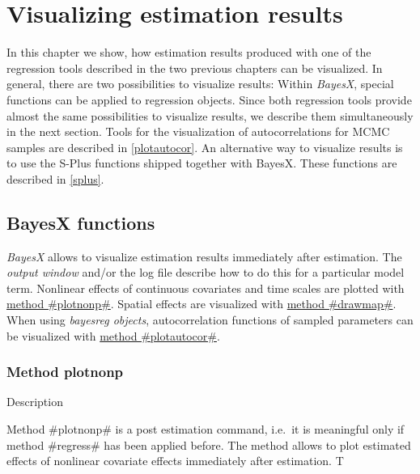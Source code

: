 \chapter{Visualizing estimation results}
\label{visualization} 

In this chapter we show, how estimation results produced with one of
the regression tools described in the two previous chapters can be
visualized. In general, there are two possibilities to visualize
results: Within {\em BayesX}, special functions can be applied to
regression objects. Since both regression tools provide almost the
same possibilities to visualize results, we describe them
simultaneously in the next section. Tools for the visualization of
autocorrelations for MCMC samples are described in
\autoref{plotautocor}. An alternative way to visualize results is to
use the S-Plus functions shipped together with BayesX. These
functions are described in \autoref{splus}.

\section{BayesX functions} \label{bayesxplot}

{\em BayesX} allows to visualize estimation results immediately
after estimation. The {\em output window} and/or the log file
describe how to do this for a particular model term. Nonlinear
effects of continuous covariates and time scales are plotted with
\hyperref[bayesxplotnonp]{method #plotnonp#}. Spatial effects are
visualized with \hyperref[drawmap]{method #drawmap#}. When using
{\em bayesreg objects}, autocorrelation functions of sampled
parameters can be visualized with \hyperref[plotautocor]{method
#plotautocor#}.

\newpage

\subsection{Method plotnonp} \label{bayesxplotnonp}  

\begin{stanza}{Description}

Method #plotnonp# is a post estimation command, i.e.~it is
meaningful only if method #regress# has been applied before. The
method allows to plot estimated effects of nonlinear covariate
effects immediately after estimation. T

\end{stanza}

